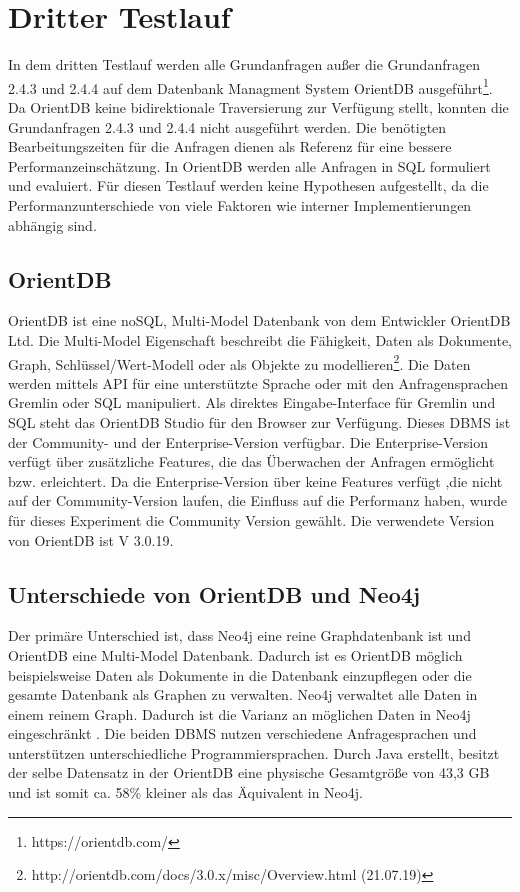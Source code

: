 \section{Dritter Testlauf}
In dem dritten Testlauf werden alle Grundanfragen außer die Grundanfragen 2.4.3 und 2.4.4 auf dem Datenbank Managment System OrientDB ausgeführt\footnote{https://orientdb.com/}. Da OrientDB keine bidirektionale Traversierung zur Verfügung stellt, konnten die Grundanfragen 2.4.3 und 2.4.4 nicht ausgeführt werden. Die benötigten Bearbeitungszeiten für die Anfragen dienen als Referenz für eine bessere Performanzeinschätzung. In OrientDB werden alle Anfragen in SQL formuliert und evaluiert. Für diesen Testlauf werden keine Hypothesen aufgestellt, da die Performanzunterschiede von viele Faktoren wie interner Implementierungen abhängig sind. 
\subsection{OrientDB}
OrientDB ist eine noSQL,  Multi-Model Datenbank von dem Entwickler OrientDB Ltd. Die Multi-Model Eigenschaft beschreibt die Fähigkeit, Daten als Dokumente, Graph, Schlüssel/Wert-Modell oder als Objekte zu modellieren\footnote{http://orientdb.com/docs/3.0.x/misc/Overview.html (21.07.19)}. Die Daten werden mittels API für eine unterstützte Sprache oder mit den Anfragensprachen Gremlin oder SQL manipuliert. Als direktes Eingabe-Interface für Gremlin und SQL steht das OrientDB Studio für den Browser zur Verfügung.  Dieses DBMS ist der Community- und der Enterprise-Version verfügbar. Die Enterprise-Version verfügt über zusätzliche Features, die das Überwachen der Anfragen ermöglicht bzw. erleichtert. Da die Enterprise-Version über keine Features verfügt ,die nicht auf der Community-Version laufen, die Einfluss auf die  Performanz haben, wurde für dieses Experiment die Community Version gewählt. Die verwendete Version von OrientDB ist V 3.0.19. 
\subsection{Unterschiede von OrientDB und Neo4j}
Der primäre Unterschied ist, dass Neo4j eine reine Graphdatenbank ist und OrientDB eine Multi-Model Datenbank. Dadurch ist es OrientDB möglich beispielsweise Daten als Dokumente in die Datenbank einzupflegen oder die gesamte Datenbank als Graphen zu verwalten. Neo4j verwaltet alle Daten in einem reinem Graph. Dadurch ist  die Varianz an möglichen Daten in Neo4j eingeschränkt \parencite{fernandes2018graph}. Die beiden DBMS nutzen verschiedene Anfragesprachen und unterstützen unterschiedliche Programmiersprachen. Durch Java erstellt, besitzt der selbe Datensatz in der OrientDB eine physische Gesamtgröße von 43,3 GB und ist somit ca. 58\% kleiner als das Äquivalent in Neo4j.